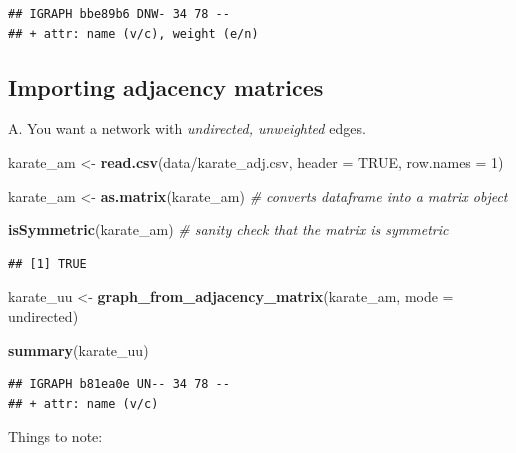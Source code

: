 \documentclass[
]{book}
\newenvironment{Shaded}{\begin{snugshade}}{\end{snugshade}}
\newcommand{\AttributeTok}[1]{\textcolor[rgb]{0.13,0.29,0.53}{#1}}
\newcommand{\CommentTok}[1]{\textcolor[rgb]{0.56,0.35,0.01}{\textit{#1}}}
\newcommand{\ConstantTok}[1]{\textcolor[rgb]{0.56,0.35,0.01}{#1}}
\newcommand{\DecValTok}[1]{\textcolor[rgb]{0.00,0.00,0.81}{#1}}
\newcommand{\FunctionTok}[1]{\textcolor[rgb]{0.13,0.29,0.53}{\textbf{#1}}}
\newcommand{\NormalTok}[1]{#1}
\newcommand{\OtherTok}[1]{\textcolor[rgb]{0.56,0.35,0.01}{#1}}
\newcommand{\StringTok}[1]{\textcolor[rgb]{0.31,0.60,0.02}{#1}}
\begin{document}
\begin{verbatim}
## IGRAPH bbe89b6 DNW- 34 78 -- 
## + attr: name (v/c), weight (e/n)
\end{verbatim}

\subsection{Importing adjacency matrices}\label{importing-adjacency-matrices}

A. You want a network with \emph{undirected, unweighted} edges.

\begin{Shaded}
\begin{Highlighting}[]
\NormalTok{karate\_am }\OtherTok{\textless{}{-}} \FunctionTok{read.csv}\NormalTok{(}\StringTok{\textquotesingle{}data/karate\_adj.csv\textquotesingle{}}\NormalTok{, }\AttributeTok{header =} \ConstantTok{TRUE}\NormalTok{, }\AttributeTok{row.names =} \DecValTok{1}\NormalTok{)}

\NormalTok{karate\_am }\OtherTok{\textless{}{-}} \FunctionTok{as.matrix}\NormalTok{(karate\_am) }\CommentTok{\# converts dataframe into a matrix object}

\FunctionTok{isSymmetric}\NormalTok{(karate\_am) }\CommentTok{\# sanity check that the matrix is symmetric }
\end{Highlighting}
\end{Shaded}

\begin{verbatim}
## [1] TRUE
\end{verbatim}

\begin{Shaded}
\begin{Highlighting}[]
\NormalTok{karate\_uu }\OtherTok{\textless{}{-}} \FunctionTok{graph\_from\_adjacency\_matrix}\NormalTok{(karate\_am, }\AttributeTok{mode =} \StringTok{\textquotesingle{}undirected\textquotesingle{}}\NormalTok{)}

\FunctionTok{summary}\NormalTok{(karate\_uu)}
\end{Highlighting}
\end{Shaded}

\begin{verbatim}
## IGRAPH b81ea0e UN-- 34 78 -- 
## + attr: name (v/c)
\end{verbatim}

Things to note:
\end{document}
